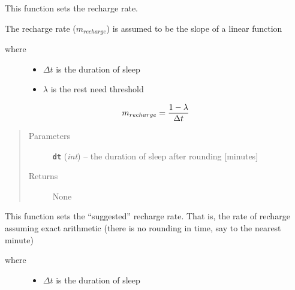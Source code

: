 \documentclass[letterpaper,10pt,english]{sphinxmanual}
\begin{document}
\begin{fulllineitems}
\begin{fulllineitems}
\end{fulllineitems}


\begin{fulllineitems}
\label{rest:rest.Rest.set_recharge_rate}
This function sets the recharge rate.

The recharge rate (\(m_{recharge}\)) is assumed to be the slope of a linear function
\begin{description}
\item[{where}] \leavevmode\begin{itemize}
\item {} 
\(\Delta{t}\) is the duration of sleep

\item {} 
\(\lambda\) is the rest need threshold

\end{itemize}

\end{description}
\begin{gather}
\begin{split}m_{recharge} = \frac{1 - \lambda}{ \Delta{t} }\end{split}\notag
\end{gather}\begin{quote}\begin{description}
\item[{Parameters}] \leavevmode
\textbf{\texttt{dt}} (\emph{int}) -- the duration of sleep after rounding {[}minutes{]}

\item[{Returns}] \leavevmode
None

\end{description}\end{quote}

\end{fulllineitems}


\begin{fulllineitems}
\label{rest:rest.Rest.set_suggested_recharge_rate}
This function sets the ``suggested'' recharge rate. That is, the rate of recharge assuming exact         arithmetic (there is no rounding in time, say to the nearest minute)
\begin{description}
\item[{where}] \leavevmode\begin{itemize}
\item {} 
\(\Delta{t}\) is the duration of sleep


\end{itemize}
\end{description}
\end{fulllineitems}
\end{fulllineitems}
\end{document}
